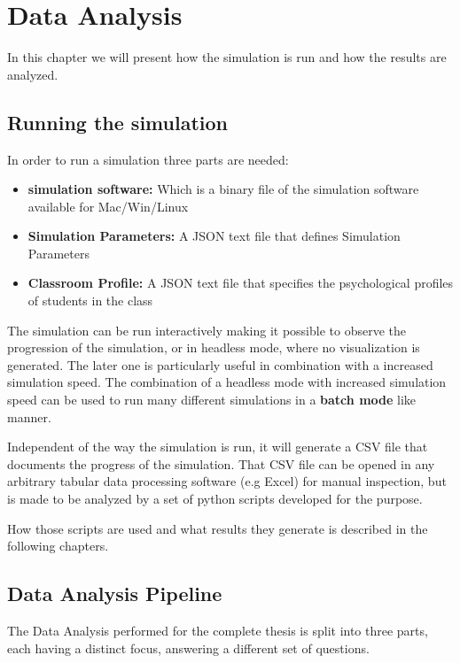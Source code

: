 \chapter{Data Analysis}
In this chapter we will present how the simulation is run and how the results are analyzed.

\section{Running the simulation}

In order to run a simulation three parts are needed:

\begin{itemize}
    \item \textbf{simulation software:} Which is a binary file of the simulation software available for Mac/Win/Linux
    \item \textbf{Simulation Parameters:} A JSON text file that defines Simulation Parameters
    \item \textbf{Classroom Profile:} A JSON text file that specifies the psychological profiles of students in the class
\end{itemize}

The simulation can be run interactively making it possible to observe the progression
of the simulation, or in headless mode, where no visualization is generated.
The later one is particularly useful in combination with a increased simulation
speed. The combination of a headless mode with increased simulation speed can be
used to run many different simulations in a \textbf{batch mode} like manner.

\bb

Independent of the way the simulation is run, it will generate a CSV file that
documents the progress of the simulation. That CSV file can be opened in any
arbitrary tabular data processing software (e.g Excel) for manual inspection, but
is made to be analyzed by a set of python scripts developed for the purpose.

How those scripts are used and what results they generate is described in the following chapters.

\section{Data Analysis Pipeline}
The Data Analysis performed for the complete thesis is split into three parts, each 
having a distinct focus, answering a different set of questions.

